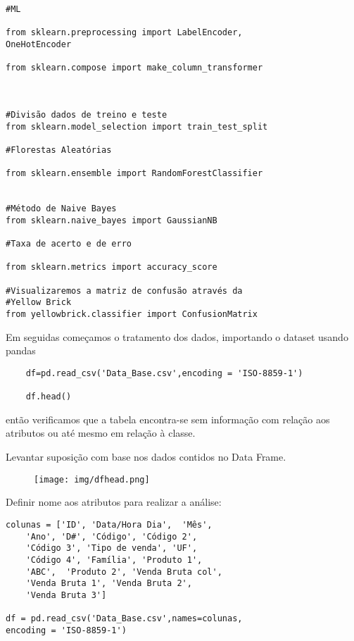 \documentclass[compress]{beamer}
\begin{document}
\begin{verbatim}
#ML

from sklearn.preprocessing import LabelEncoder,
OneHotEncoder

from sklearn.compose import make_column_transformer



#Divisão dados de treino e teste
from sklearn.model_selection import train_test_split

#Florestas Aleatórias

from sklearn.ensemble import RandomForestClassifier


#Método de Naive Bayes
from sklearn.naive_bayes import GaussianNB

#Taxa de acerto e de erro

from sklearn.metrics import accuracy_score

#Visualizaremos a matriz de confusão através da
#Yellow Brick
from yellowbrick.classifier import ConfusionMatrix
\end{verbatim}

Em seguidas começamos o tratamento dos dados, importando o dataset usando pandas

\begin{verbatim}
    df=pd.read_csv('Data_Base.csv',encoding = 'ISO-8859-1')
    
    df.head()
\end{verbatim}
então verificamos que a tabela encontra-se sem informação com relação aos atributos ou até mesmo em relação à classe.

Levantar suposição com base nos dados contidos no Data Frame.

\begin{frame}{}
\begin{figure}[h!]
    \centering
    \texttt{[image: img/dfhead.png]}
\end{figure}

Definir nome aos atributos para realizar a análise:
\end{frame}

\begin{verbatim}
colunas = ['ID', 'Data/Hora Dia',  'Mês',
    'Ano', 'D#', 'Código', 'Código 2',
    'Código 3', 'Tipo de venda', 'UF',
    'Código 4', 'Família', 'Produto 1',
    'ABC',  'Produto 2', 'Venda Bruta col',
    'Venda Bruta 1', 'Venda Bruta 2',
    'Venda Bruta 3']
    
df = pd.read_csv('Data_Base.csv',names=colunas,
encoding = 'ISO-8859-1')    
    
\end{verbatim}
\end{document}
